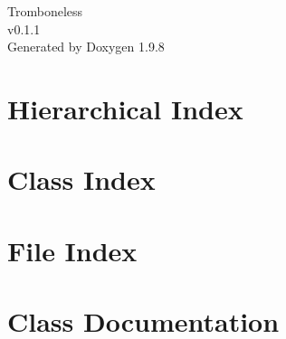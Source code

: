 \documentclass[twoside]{book}
\newcommand{\+}{\discretionary{\mbox{\scriptsize$\hookleftarrow$}}{}{}}
\newcommand{\clearemptydoublepage}{%
    \newpage{\pagestyle{empty}\cleardoublepage}%
  }
\begin{document}
  \raggedbottom
    \hypersetup{pageanchor=false,
                bookmarksnumbered=true,
                pdfencoding=unicode
               }
  \begin{titlepage}
  \vspace*{7cm}
  \begin{center}%
  {\Large Tromboneless}\\
  [1ex]\large v0.\+1.\+1 \\
  \vspace*{1cm}
  {\large Generated by Doxygen 1.9.8}\\
  \end{center}
  \end{titlepage}
  \clearemptydoublepage
  \tableofcontents
  \clearemptydoublepage
  \hypersetup{pageanchor=true}




\chapter{Hierarchical Index}

\chapter{Class Index}

\chapter{File Index}

\chapter{Class Documentation}












































\end{document}
